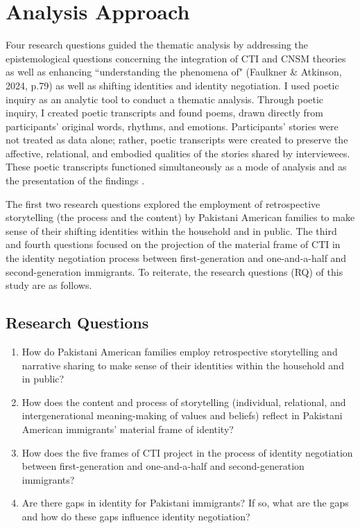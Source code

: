 \section{Analysis Approach}

Four research questions guided the thematic analysis by addressing the epistemological questions concerning the integration of CTI and CNSM theories as well as enhancing ``understanding the phenomena of" (Faulkner \& Atkinson, 2024, p.79) as well as shifting identities and identity negotiation. I used poetic inquiry as an analytic tool to conduct a thematic analysis. Through poetic inquiry, I created poetic transcripts and found poems, drawn directly from participants’ original words, rhythms, and emotions. Participants’ stories were not treated as data alone; rather, poetic transcripts were created to preserve the affective, relational, and embodied qualities of the stories shared by interviewees. These poetic transcripts functioned simultaneously as a mode of analysis and as the presentation of the findings \citep{faulknerSettingAgendaPoetic2023, faulknerPoeticInquiryCraft2019}. 

The first two research questions explored the employment of retrospective storytelling (the process and the content) by Pakistani American families to make sense of their shifting identities within the household and in public. The third and fourth questions focused on the projection of the material frame of CTI in the identity negotiation process between first-generation and one-and-a-half and second-generation immigrants. To reiterate, the research questions (RQ) of this study are as follows.

\subsection{Research Questions}

\begin{enumerate}
    \item How do Pakistani American families employ retrospective storytelling and narrative sharing to make sense of their identities within the household and in public?
    \item How does the content and process of storytelling (individual, relational, and intergenerational meaning-making of values and beliefs) reflect in Pakistani American immigrants’ material frame of identity?
    \item How does the five frames of CTI project in the process of identity negotiation between first-generation and one-and-a-half and second-generation immigrants?
    \item Are there gaps in identity for Pakistani immigrants? If so, what are the gaps and how do these gaps influence identity negotiation?
\end{enumerate}

